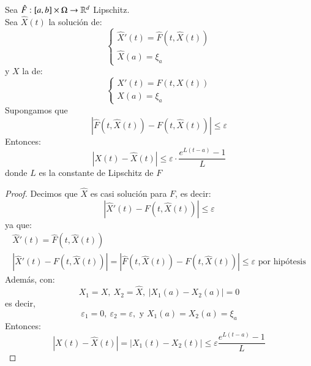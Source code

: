\begin{pro}
    Sea $\hat{F} : [a, b] \times \Omega \to \mathbb{R}^d$ Lipschitz.\\
    Sea $\hat{X}(t)$ la solución de:
    $$
        \begin{cases}
            \hat{X}'(t) = \hat{F}(t, \hat{X}(t))\\
            \hat{X}(a)=\xi_a
        \end{cases}
    $$
    y $X$ la de:
    $$
    \begin{cases}
        X'(t) = F(t, X(t))\\
        X(a)=\xi_a
    \end{cases}
    $$
    Supongamos que
    $$
        |\hat{F} (t, \hat{X}(t)) - F(t, \hat{X}(t))| \leq \varepsilon
    $$
    Entonces:
    $$
        |X(t) - \hat{X}(t)| \leq \varepsilon \cdot \frac{e^{L(t-a)}-1}{L}
    $$
     donde $L$ es la constante de Lipschitz de $F$
\end{pro}
\begin{proof}
    Decimos que $\hat{X}$ es casi solución para $F$, es decir:
    $$
        |\hat{X}'(t) - F(t, \hat{X}(t))| \leq \varepsilon
    $$
    ya que:
    \begin{gather*}
        \hat{X}'(t) = \hat{F}(t, \hat{X}(t))\\
        |\hat{X}'(t) - F(t, \hat{X}(t))| = |\hat{F} (t, \hat{X}(t)) - F(t, \hat{X}(t))| \leq \varepsilon \text{ por hipótesis}
    \end{gather*}
    Además, con:
    $$
        X_1 = X,\ X_2 = \hat{X},\ |X_1(a) - X_2(a)| = 0
    $$
    es decir,
    $$
        \varepsilon_1 = 0,\  \varepsilon_2 = \varepsilon, \text{ y } X_1(a) = X_2(a) = \xi_a
    $$
    Entonces:
    $$
        |X(t) - \hat{X}(t)| = |X_1(t) - X_2(t)| \leq \varepsilon \frac{e^{L(t-a)}-1}{L}
    $$
\end{proof}

